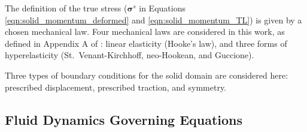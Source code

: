 \documentclass[sn-mathphys,Numbered]{sn-jnl}%
\newcommand{\bb}{\boldsymbol}
\begin{document}

The definition of the true stress ($\bb{\sigma}^s$ in Equations \ref{eqn:solid_momentum_deformed} and \ref{eqn:solid_momentum_TL}) is given by a chosen mechanical law.
Four mechanical laws are considered in this work, as defined in Appendix A of \citet{Cardiff2025JFNK}: linear elasticity (Hooke's law), and three forms of hyperelasticity (St.\ Venant-Kirchhoff, neo-Hookean, and Guccione).

Three types of boundary conditions for the solid domain are considered here: prescribed displacement, prescribed traction, and symmetry.




\subsection{Fluid Dynamics Governing Equations} \label{sec:fluid_governing_eqn}
\end{document}
